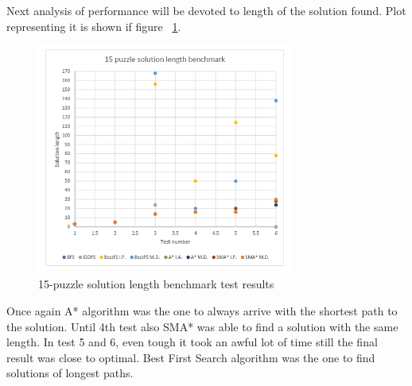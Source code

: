 \documentclass[12pt]{article}
\begin{document}
Next analysis of performance will be devoted to length of the solution found. Plot representing it is shown if figure  ~\ref{fifteen-puzzle-plot-length}.

 \begin{figure}[h]
    \includegraphics[width=0.75\textwidth]{15_puzzle_length}
    \centering
    \caption{15-puzzle solution length benchmark test results}
\label {fifteen-puzzle-plot-length}
\end{figure}

Once again A* algorithm was the one to always arrive with the shortest path to the solution. Until 4th test also SMA* was able to find a solution with the same length. In test 5 and 6, even tough it took an awful lot of time still the final result was close to optimal. Best First Search algorithm was the one to find solutions of longest paths.

\newpage
\listoffigures
\newpage
\printbibliography
\end{document}
